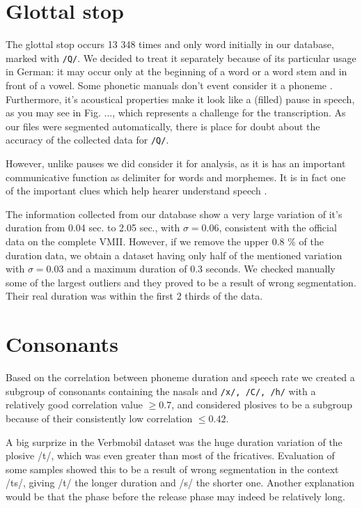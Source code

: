\documentclass[a4paper]{scrreprt}
\begin{document}
\section{Glottal stop}
The glottal stop occurs 13 348 times and only word initially in our database, marked with \texttt{/Q/}. We decided to treat it separately because of its particular usage in German: it may occur only at the beginning of a word or a word stem and in front of a vowel. Some phonetic manuals don't event consider it a phoneme \cite{Ternes2012}. Furthermore, it's acoustical properties make it look like a (filled) pause in speech, as you may see in Fig. ..., which represents a challenge for the transcription. As our files were segmented automatically, there is place for doubt about the accuracy of the collected data for \texttt{/Q/}.

However, unlike pauses we did consider it  for analysis, as it is has an important communicative function as delimiter for words and morphemes. It is in fact one of the important clues which help hearer understand speech \cite{Ternes2012}. 

The information collected from our database show a very large variation of it's duration from 0.04 sec. to 2.05 sec., with $\sigma = 0.06$, consistent with the official data on the complete VMII. However, if we remove the upper 0.8 \% of the duration data, we obtain a dataset having only half of the mentioned variation with $\sigma = 0.03$ and a maximum duration of 0.3 seconds. We checked manually some of the largest outliers and they proved to be a result of wrong segmentation. Their real duration was within the first 2 thirds of the data.

\section{Consonants}
Based on the correlation between phoneme duration and speech rate we created a subgroup of consonants containing the nasals and \texttt{/x/, /C/, /h/} with a relatively good correlation value $\geq 0.7$, and considered plosives to be a subgroup because of their consistently low correlation $\leq 0.42$.

A big surprize in the Verbmobil dataset was the huge duration variation of the plosive /t/, which was even greater than most of the fricatives. Evaluation of some samples showed this to be a result of wrong segmentation in the context /ts/, giving /t/ the longer duration and /s/ the shorter one. Another explanation would be that the phase before the release phase may indeed be relatively long.
\end{document}
